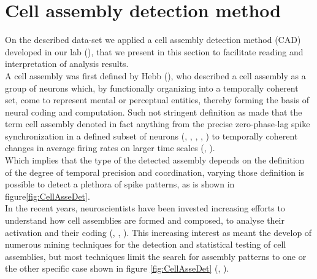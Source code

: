 \section{Cell assembly detection method}
\label{chap:AssemblyMethod}
On the described data-set we applied a cell assembly detection method (CAD) developed in our lab (\cite{RussoDurstewitz}), that we present in this section to facilitate reading and interpretation of analysis results.\\
A cell assembly was first defined by Hebb (\cite{Hebb}), who described a cell assembly as a group of neurons which, by functionally organizing into a temporally coherent set, come to represent mental or perceptual entities, thereby forming the basis of neural coding and computation. Such not stringent definition as made that the term cell assembly denoted in fact anything from the precise zero-phase-lag spike synchronization in a defined subset of neurons (\cite{Abeles}, \cite{Singer}, \cite{Roelfsema}, \cite{Diesmann}, \cite{Harris2003}) to temporally coherent changes in average firing rates on larger time scales (\cite{Goldman}, \cite{Durstewitz}).\\Which implies that the type of the detected assembly depends on the definition of the degree of temporal precision and coordination, varying those definition is possible to detect a plethora of spike patterns, as is shown in figure\ref{fig:CellAsseDet}.\\
In the recent years, neuroscientists have been invested increasing efforts to understand how cell assemblies are formed and composed, to analyse their activation and their coding (\cite{Buzsaki1}, \cite{Liu}, \cite{Cai}). This increasing interest as meant the develop of numerous mining techniques for the detection and statistical testing of cell assemblies, but most techniques limit the search for assembly patterns to one or the other specific case shown in figure \ref{fig:CellAsseDet} (\cite{Torre}, \cite{Tavoni}).
